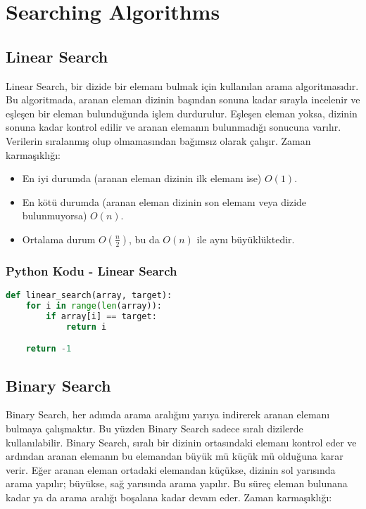 \section{Searching Algorithms}

\subsection{Linear Search}

Linear Search, bir dizide bir elemanı bulmak için kullanılan arama algoritmasıdır. Bu algoritmada, aranan eleman dizinin başından sonuna kadar sırayla incelenir ve eşleşen bir eleman bulunduğunda işlem durdurulur. Eşleşen eleman yoksa, dizinin sonuna kadar kontrol edilir ve aranan elemanın bulunmadığı sonucuna varılır. Verilerin sıralanmış olup olmamasından bağımsız olarak çalışır. Zaman karmaşıklığı:

\begin{itemize}
    \item En iyi durumda (aranan eleman dizinin ilk elemanı ise) $O(1)$.
    \item En kötü durumda (aranan eleman dizinin son elemanı veya dizide bulunmuyorsa) $O(n)$.
    \item Ortalama durum $O(\frac{n}{2})$, bu da $O(n)$ ile aynı büyüklüktedir.
\end{itemize}

\subsubsection{Python Kodu - Linear Search}

\begin{lstlisting}[language=Python]
def linear_search(array, target):
    for i in range(len(array)):
        if array[i] == target:
            return i

    return -1
\end{lstlisting}

\newpage

\subsection{Binary Search}

Binary Search, her adımda arama aralığını yarıya indirerek aranan elemanı bulmaya çalışmaktır. Bu yüzden Binary Search sadece sıralı dizilerde kullanılabilir. Binary Search, sıralı bir dizinin ortasındaki elemanı kontrol eder ve ardından aranan elemanın bu elemandan büyük mü küçük mü olduğuna karar verir. Eğer aranan eleman ortadaki elemandan küçükse, dizinin sol yarısında arama yapılır; büyükse, sağ yarısında arama yapılır. Bu süreç eleman bulunana kadar ya da arama aralığı boşalana kadar devam eder. Zaman karmaşıklığı:

